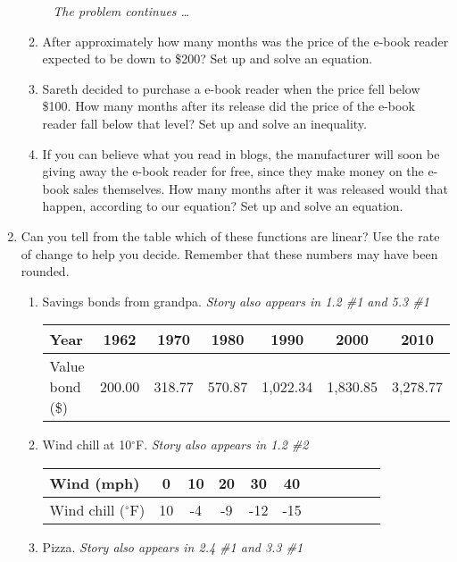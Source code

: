 \begin{enumerate}
\begin{enumerate}
\newpage %
~\hspace{-.5in} \emph{The problem continues \ldots}

\item After approximately how many months was the price of the e-book reader expected to be down to  \$200? Set up and solve an equation. \vfill  
\item Sareth decided to purchase a e-book reader when the price fell below \$100.  How many months after its release did the price of the e-book reader fall below that level?  Set up and solve an inequality. \vfill  
\item If you can believe what you read in blogs, the manufacturer will soon be giving away the e-book reader for free, since they make money on the e-book sales themselves.  How many months after it was released would that happen, according to our equation? Set up and solve an equation. \vfill  
\end{enumerate}

\newpage %

\item  Can you tell from the table which of these functions are linear?  Use the rate of change to help you decide.  Remember that these numbers may have been rounded.
\begin{enumerate}
\item  Savings bonds from grandpa.  \hfill \emph{Story also appears in 1.2 \#1 and 5.3 \#1} %

\bigskip
\begin{tabular} {|l|| c| c| c| c| c| c|} \hline
Year & 1962 & 1970 & 1980 & 1990 & 2000 & 2010\\ \hline
Value bond (\$) & 200.00 & 318.77 & 570.87 & 1,022.34 & 1,830.85 & 3,278.77 \\ \hline
\end{tabular}
\vfill


\item Wind chill at 10$^\circ$F.  \hfill \emph{Story also appears in 1.2  \#2}

\bigskip
\begin{tabular} {|l||c|c| c|c|c| c|c|c| c|c|} \hline
Wind (mph)  & 0  & 10  & 20  & 30  & 40  \\ \hline
Wind chill ($^\circ$F) & 10  & -4 & -9 & -12  & -15  \\ \hline
\end{tabular}
\vfill

\item Pizza.  \hfill \emph{Story also appears in 2.4 \#1 and 3.3 \#1}


\end{enumerate}
\end{enumerate}
